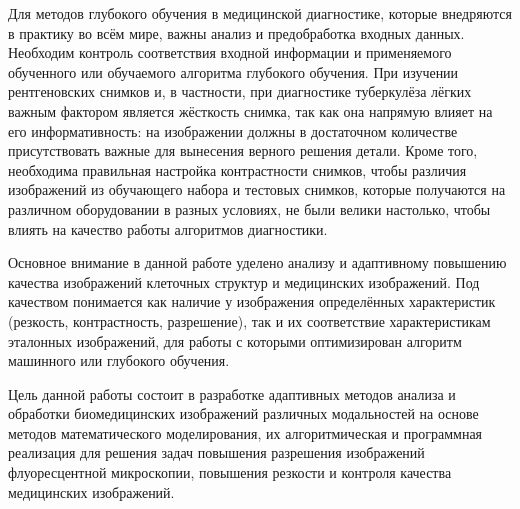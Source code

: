 Для методов глубокого обучения в медицинской диагностике, которые внедряются в практику во всём мире, важны анализ и предобработка входных данных. Необходим контроль соответствия входной информации и применяемого обученного или обучаемого алгоритма глубокого обучения. При изучении рентгеновских снимков и, в частности, при диагностике туберкулёза лёгких важным фактором является жёсткость снимка, так как она напрямую влияет на его информативность: на изображении должны в достаточном количестве присутствовать важные для вынесения верного решения детали. Кроме того, необходима правильная настройка контрастности снимков, чтобы различия изображений из обучающего набора и тестовых снимков, которые получаются на различном оборудовании в разных условиях, не были велики настолько, чтобы влиять на качество работы алгоритмов диагностики.

Основное внимание в данной работе уделено анализу и адаптивному повышению качества изображений клеточных структур и медицинских изображений. Под качеством понимается как наличие у изображения определённых характеристик (резкость, контрастность, разрешение), так и их соответствие характеристикам эталонных изображений, для работы с которыми оптимизирован алгоритм машинного или глубокого обучения.




{\aim}

Цель данной работы состоит в разработке адаптивных методов анализа и обработки биомедицинских изображений различных модальностей на основе методов математического моделирования, их алгоритмическая и программная реализация для решения задач повышения разрешения изображений флуоресцентной микроскопии, повышения резкости и контроля качества медицинских изображений.


